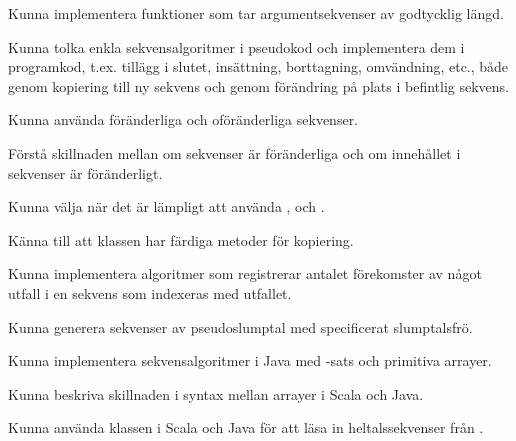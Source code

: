 
\item Kunna implementera funktioner som tar argumentsekvenser av godtycklig längd.
\item Kunna tolka enkla sekvensalgoritmer i pseudokod och implementera dem i programkod, t.ex. tillägg i slutet, insättning, borttagning, omvändning, etc., både genom kopiering till ny sekvens och genom förändring på plats i befintlig sekvens.  
\item Kunna använda föränderliga och oföränderliga sekvenser.
\item Förstå skillnaden mellan om sekvenser är föränderliga och om innehållet i sekvenser är föränderligt.
\item Kunna välja när det är lämpligt att använda ,  och .
\item Känna till att klassen  har färdiga metoder för kopiering.
\item Kunna implementera algoritmer som registrerar antalet förekomster av något utfall i en sekvens som indexeras med utfallet.
\item Kunna generera sekvenser av pseudoslumptal med specificerat slumptalsfrö. 
\item Kunna implementera sekvensalgoritmer i Java med -sats och primitiva arrayer. 
\item Kunna beskriva skillnaden i syntax mellan arrayer i Scala och Java.
\item Kunna använda klassen  i Scala och Java för att läsa in heltalssekvenser från . 

